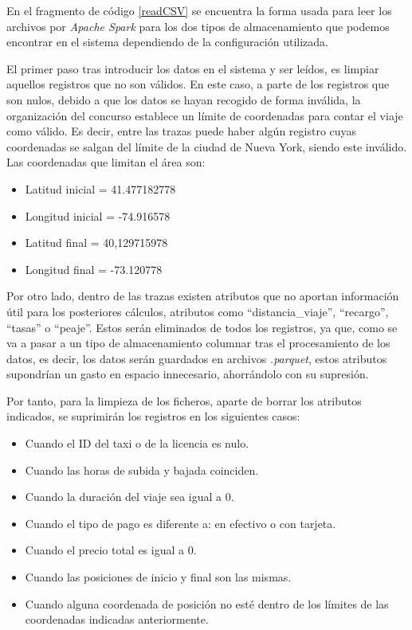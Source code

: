 En el fragmento de código \ref{readCSV} se encuentra la forma usada para leer los archivos por \textit{Apache Spark} para los dos tipos de almacenamiento que podemos encontrar en el sistema dependiendo de la configuración utilizada.

El primer paso tras introducir los datos en el sistema y ser leídos, es limpiar aquellos registros que no son válidos. En este caso, a parte de los registros que son nulos, debido a que los datos se hayan recogido de forma inválida, la organización del concurso establece un límite de coordenadas para contar el viaje como válido. Es decir, entre las trazas puede haber algún registro cuyas coordenadas se salgan del límite de la ciudad de Nueva York, siendo este inválido. Las coordenadas que limitan el área son:

\begin{itemize}
\item Latitud inicial = 41.477182778
\item Longitud inicial = -74.916578
\item Latitud final = 40,129715978
\item Longitud final = -73.120778
\end{itemize}

Por otro lado, dentro de las trazas existen atributos que no aportan información útil para los posteriores cálculos, atributos como ``distancia\_viaje'', ``recargo'', ``tasas'' o ``peaje''. Estos serán eliminados de todos los registros, ya que, como se va a pasar a un tipo de almacenamiento columnar tras el procesamiento de los datos, es decir, los datos serán guardados en archivos \textit{.parquet}, estos atributos supondrían un gasto en espacio innecesario, ahorrándolo con su supresión.

Por tanto, para la limpieza de los ficheros, aparte de borrar los atributos indicados, se suprimirán los registros en los siguientes casos:

\begin{itemize}
\item Cuando el ID del taxi o de la licencia es nulo.
\item Cuando las horas de subida y bajada coinciden.
\item Cuando la duración del viaje sea igual a 0.
\item Cuando el tipo de pago es diferente a: en efectivo o con tarjeta.
\item Cuando el precio total es igual a 0.
\item Cuando las posiciones de inicio y final son las mismas.
\item Cuando alguna coordenada de posición no esté dentro de los límites de las coordenadas indicadas anteriormente.
\end{itemize}

